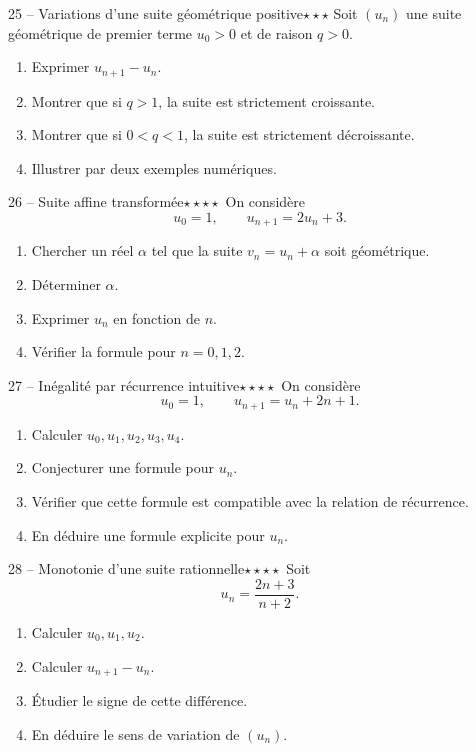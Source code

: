 \documentclass[11pt,a4paper]{article}
\newcommand{\troisetoiles}{\(\star\star\star\)}
\newcommand{\quatreetoiles}{\(\star\star\star\star\)}
\begin{document}
\begin{exobox}{25 -- Variations d'une suite géométrique positive}{\troisetoiles}
Soit \((u_n)\) une suite géométrique de premier terme \(u_0>0\) et de raison \(q>0\).
\begin{enumerate}[label=\alph*)]
  \item Exprimer \(u_{n+1}-u_n\).
  \item Montrer que si \(q>1\), la suite est strictement croissante.
  \item Montrer que si \(0<q<1\), la suite est strictement décroissante.
  \item Illustrer par deux exemples numériques.
\end{enumerate}
\end{exobox}

\begin{exobox}{26 -- Suite affine transformée}{\quatreetoiles}
On considère
\[
u_0=1,\qquad u_{n+1}=2u_n+3.
\]
\begin{enumerate}[label=\alph*)]
  \item Chercher un réel \(\alpha\) tel que la suite \(v_n=u_n+\alpha\) soit géométrique.
  \item Déterminer \(\alpha\).
  \item Exprimer \(u_n\) en fonction de \(n\).
  \item Vérifier la formule pour \(n=0,1,2\).
\end{enumerate}
\end{exobox}

\begin{exobox}{27 -- Inégalité par récurrence intuitive}{\quatreetoiles}
On considère
\[
u_0=1,\qquad u_{n+1}=u_n+2n+1.
\]
\begin{enumerate}[label=\alph*)]
  \item Calculer \(u_0,u_1,u_2,u_3,u_4\).
  \item Conjecturer une formule pour \(u_n\).
  \item Vérifier que cette formule est compatible avec la relation de récurrence.
  \item En déduire une formule explicite pour \(u_n\).
\end{enumerate}
\end{exobox}

\begin{exobox}{28 -- Monotonie d'une suite rationnelle}{\quatreetoiles}
Soit
\[
u_n=\frac{2n+3}{n+2}.
\]
\begin{enumerate}[label=\alph*)]
  \item Calculer \(u_0,u_1,u_2\).
  \item Calculer \(u_{n+1}-u_n\).
  \item Étudier le signe de cette différence.
  \item En déduire le sens de variation de \((u_n)\).
\end{enumerate}
\end{exobox}
\end{document}
